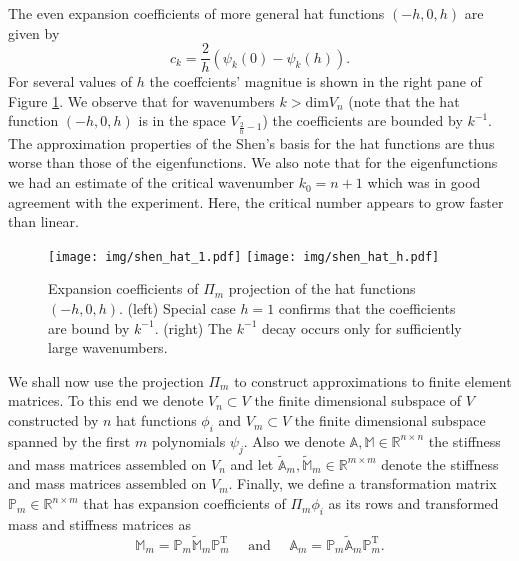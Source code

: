 \documentclass[a4paper,10pt]{article}
\newcommand{\R}{\ensuremath{\mathbb{R}}}
\newcommand{\Amat}{\ensuremath{\mathbb{A}}}
\newcommand{\Mmat}{\ensuremath{\mathbb{M}}}
\newcommand{\Ammatt}{\ensuremath{\tilde{\mathbb{A}}_m}}              %
\newcommand{\Mmmatt}{\ensuremath{\tilde{\mathbb{M}}_m}}              %
\newcommand{\Ammat}{\ensuremath{\mathbb{A}_m}}               %
\newcommand{\Mmmat}{\ensuremath{\mathbb{M}_m}}               %
\newcommand{\Pmat}{\ensuremath{\mathbb{P}_m}}                  %
\newcommand{\Pmatt}{\ensuremath{\mathbb{P}_m^{\text{T}}}}       %
\begin{document}
  The even expansion coefficients of more general hat functions $(-h, 0, h)$
  are given by
  \[
    c_{k} = \frac{2}{h}\left(\psi_k\left(0\right)- \psi_k\left(h\right)\right).
  \]
  For several values of $h$ the coeffcients' magnitue is shown in the right pane
  of Figure \ref{fig:shen_hat_projection}. We observe that for wavenumbers
  $k>\text{dim}V_n$ (note that the hat function $(-h, 0, h)$ is in the space
  $V_{\frac{2}{h}-1}$) the coefficients are bounded by $k^{-1}$. The
  approximation properties of the Shen's basis for the hat functions are thus
  worse than those of the eigenfunctions. We also note that for the
  eigenfunctions we had an estimate of the critical wavenumber $k_0=n+1$ which
  was in good agreement with the experiment. Here, the critical number appears
  to grow faster than linear.
  \begin{figure}
  \begin{center}
    \texttt{[image: img/shen\_hat\_1.pdf]}
    \texttt{[image: img/shen\_hat\_h.pdf]}
  \end{center}
  \label{fig:shen_hat_projection}
  \caption{Expansion coefficients of $\Pi_m$ projection of the hat functions
    $(-h, 0, h)$. (left) Special case $h=1$ confirms that the coefficients 
    are bound by $k^{-1}$. (right) The $k^{-1}$ decay occurs only for
    sufficiently large wavenumbers.}
  \end{figure}

  We shall now use the projection $\Pi_m$ to construct approximations to finite
  element matrices. To this end we denote $V_n\subset V$ the finite dimensional
  subspace of $V$ constructed by $n$ hat functions $\phi_i$ and $V_m\subset V$
  the finite dimensional subspace spanned by the first $m$ polynomials
  $\psi_j$. Also we denote $\Amat, \Mmat \in \R^{n \times n}$
  the stiffness and mass matrices assembled on $V_n$ and let
  $\Ammatt, \Mmmatt \in \R^{m\times m}$ denote the stiffness and mass matrices
  assembled on $V_m$. Finally, we define a transformation matrix
  $\Pmat\in\R^{n \times m}$ that has expansion coefficients of $\Pi_m\phi_i$
  as its rows and transformed mass and stiffness matrices as
  \[
    \Mmmat = \Pmat\Mmmatt\Pmatt
    \quad{\text{ and }}\quad
    \Ammat = \Pmat\Ammatt\Pmatt.
  \]
  
\end{document}
